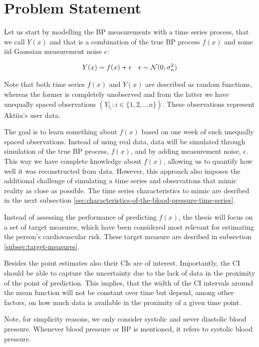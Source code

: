 \section{Problem Statement}

Let us start by modelling the BP measurements with a time series process, that we call
$Y(x)$ and that is a combination of the true BP process $f(x)$ and some iid
Gaussian measurement noise $\epsilon$:

\begin{align*}
    Y(x) = f(x) + \epsilon && \epsilon \sim \operatorname{\mathcal{N}}(0, \sigma_n^{2})
\end{align*}

Note that both time series $f(x)$ and $Y(x)$ are described as random functions,
whereas the former is completely unobserved and from the latter we have
unequally spaced observations $(Y_{t_i}: i \in \{1, 2, \dots n\})$.
These observations represent Aktiia's user data.

The goal is to learn something about $f(x)$ based on one week of such unequally
spaced observations.
Instead of using real data, data will be simulated through simulation of the
true BP process, $f(x)$, and by adding measurement noise, $\epsilon$.
This way we have complete knowledge about $f(x)$, allowing us to quantify
how well it was reconstructed from data.
However, this approach also imposes the additional challenge
of simulating a time series and observations that mimic reality as close
as possible.
The time series characteristics to mimic are desribed in the next subsection
\ref{sec:characteristics-of-the-blood-pressure-time-series}.

Instead of assessing the performance of predicting $f(x)$,
the thesis will focus on a set of target measures,
which have been considered most relevant for estimating the person’s cardiovascular risk.
These target measure are desribed in subsection \ref{subsec:target-measures}.

Besides the point estimates also their CIs are of interest.
Importantly, the CI should be able to capture the uncertainty due to the lack
of data in the proximity of the point of prediction.
This implies, that the width of the CI intervals around the mean function will
not be constant over time but depend, among
other factors, on how much data is available in the proximity of a given time point.

Note, for simplicity reasons, we only consider systolic and never diastolic
blood pressure.
Whenever blood pressure or BP is mentioned, it refers to systolic blood pressure.


